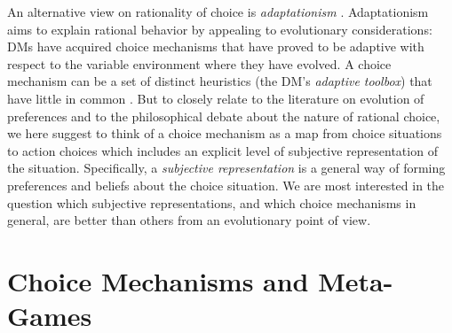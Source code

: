 \documentclass[fleqn,reqno,12pt]{article}
\theoremstyle{Satz}
\theoremstyle{Bsp}
\begin{document}
An alternative view on rationality of choice is \emph{adaptationism}
\citep[e.g.,][]{Anderson1991:Is-human-cognit,ChaterOaksford2000:The-Rational-An,HagenChater2012:Decision-Making}. Adaptationism
aims to explain rational behavior by appealing to evolutionary considerations: DMs have
acquired choice mechanisms that have proved to be adaptive with respect to the variable
environment where they have evolved. A choice mechanism can be a set of distinct heuristics
(the DM's \emph{adaptive toolbox}) that have little in common
\citep[e.g.,][]{TverskyKahnemann1981:The-Framing-of-,GigerenzerGoldstein1996:Reasoning-the-F,ScheibehenneRieskamp2013:Testing-the-Ada}. But
to closely relate to the literature on evolution of preferences and to the philosophical debate
about the nature of rational choice, we here suggest to think of a choice mechanism as a map
from choice situations to action choices which includes an explicit level of subjective
representation of the situation. Specifically, a \emph{subjective representation} is a general
way of forming preferences and beliefs about the choice situation. We are most interested in
the question which subjective representations, and which choice mechanisms in general, are
better than others from an evolutionary point of view.


\section{Choice Mechanisms and Meta-Games} 
\label{sec:subj-ut,bel,dec-rules}
\end{document}
